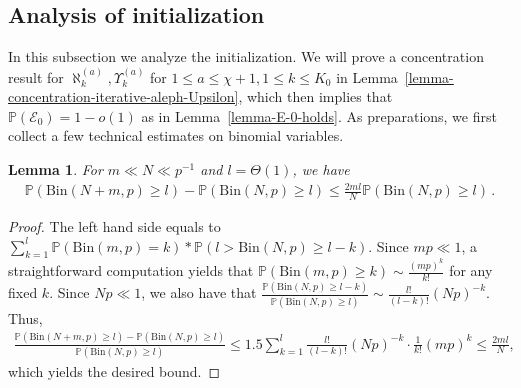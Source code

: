 \documentclass[11pt]{article}
\def\P{\mathbb{P}}
\newtheorem{Lemma}[Theorem]{Lemma}
\numberwithin{equation}{section}
\begin{document}
\subsection{Analysis of initialization} \label{sec:priliminary-events}
In this subsection we analyze the initialization. We will prove a concentration result for $\aleph^{(a)}_k,\Upsilon^{(a)}_k$ for $1 \leq a \leq \chi+1, 1 \leq k \leq K_0$ in Lemma~\ref{lemma-concentration-iterative-aleph-Upsilon}, which then implies that $\P(\mathcal{E}_{0}) = 1- o(1)$ as in Lemma~\ref{lemma-E-0-holds}. As preparations, we first collect a few technical estimates on binomial variables. 
\begin{Lemma} \label{lemma-difference-Bernoulli-tail-I}
For $m \ll N \ll p^{-1}$ and $l=\Theta(1)$, we have
\begin{align*}
    \mathbb{P}( \mathrm{Bin}(N+m,p) \geq l ) - \mathbb{P}( \mathrm{Bin}(N,p) \geq l ) \leq \frac{2ml}{N} \mathbb{P}( \mathrm{Bin}(N,p) \geq l ) \,.
\end{align*}
\end{Lemma}
\begin{proof}
The left hand side equals to $\sum_{k=1}^{l} \mathbb{P}( \mathrm{Bin}(m,p) = k ) * \mathbb{P}( l > \mathrm{Bin}(N,p) \geq l-k )$. Since $mp \ll 1$, a straightforward computation yields that $\mathbb{P}(\mathrm{Bin}(m,p) \geq k) \sim \frac{ (mp)^{k} }{k!} $ for any fixed $k$. Since $Np \ll 1$, we also have that $\frac{ \mathbb{P}( \mathrm{Bin}(N,p) \geq l-k ) }{ \mathbb{P}( \mathrm{Bin}(N,p) \geq l) } \sim \frac{l!}{(l-k)!} (Np)^{-k} $. Thus,
\begin{align*}
    \frac{ \mathbb{P}( \mathrm{Bin}(N+m,p) \geq l ) - \mathbb{P}( \mathrm{Bin}(N,p) \geq l )}{ \mathbb{P}( \mathrm{Bin}(N,p) \geq l )} \leq 1.5 \sum_{k=1}^{l} \frac{l!}{(l-k)!} (Np)^{-k} \cdot\frac{1}{k!}(mp)^{k} \leq \frac{2ml}{N},
\end{align*}
which yields the desired bound.
\end{proof}
\end{document}
